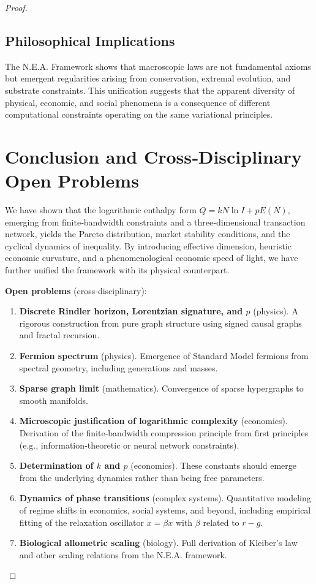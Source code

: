 \documentclass{article}
\begin{document}
\begin{proof}
\subsection{Philosophical Implications}
The N.E.A. Framework shows that macroscopic laws are not fundamental axioms but emergent regularities arising from conservation, extremal evolution, and substrate constraints. This unification suggests that the apparent diversity of physical, economic, and social phenomena is a consequence of different computational constraints operating on the same variational principles.

\section{Conclusion and Cross‑Disciplinary Open Problems}
We have shown that the logarithmic enthalpy form $Q = k N \ln I + pE(N)$, emerging from finite‑bandwidth constraints and a three‑dimensional transaction network, yields the Pareto distribution, market stability conditions, and the cyclical dynamics of inequality. By introducing effective dimension, heuristic economic curvature, and a phenomenological economic speed of light, we have further unified the framework with its physical counterpart.

\textbf{Open problems} (cross‑disciplinary):
\begin{enumerate}
    \item \textbf{Discrete Rindler horizon, Lorentzian signature, and $p$} (physics). A rigorous construction from pure graph structure using signed causal graphs and fractal recursion.
    \item \textbf{Fermion spectrum} (physics). Emergence of Standard Model fermions from spectral geometry, including generations and masses.
    \item \textbf{Sparse graph limit} (mathematics). Convergence of sparse hypergraphs to smooth manifolds.
    \item \textbf{Microscopic justification of logarithmic complexity} (economics). Derivation of the finite‑bandwidth compression principle from first principles (e.g., information‑theoretic or neural network constraints).
    \item \textbf{Determination of $k$ and $p$} (economics). These constants should emerge from the underlying dynamics rather than being free parameters.
    \item \textbf{Dynamics of phase transitions} (complex systems). Quantitative modeling of regime shifts in economics, social systems, and beyond, including empirical fitting of the relaxation oscillator $\dot{x} = \beta x$ with $\beta$ related to $r-g$.
    \item \textbf{Biological allometric scaling} (biology). Full derivation of Kleiber’s law and other scaling relations from the N.E.A. framework.
\end{enumerate}


\end{proof}
\end{document}
